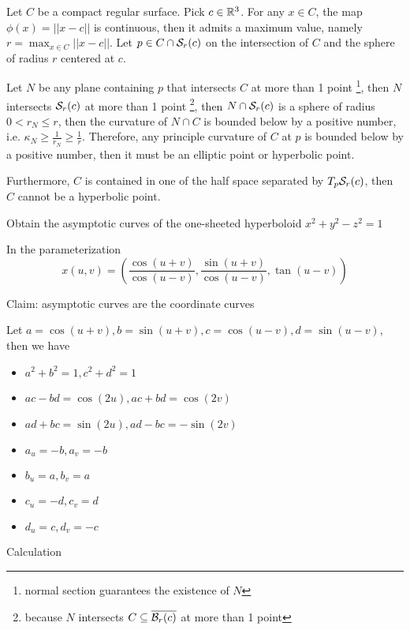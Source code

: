 \documentclass{article}
\begin{document}
Let $C$ be a compact regular surface. Pick $c \in \mathbb{R}^3$. For any $x \in C$, the map $\phi(x) = ||x - c||$ is continuous, then it admits a maximum value, namely $r = \max_{x \in C} ||x - c||$. Let $p \in C \cap \mathcal{S}_r(c)$ on the intersection of $C$ and the sphere of radius $r$ centered at $c$.

Let $N$ be any plane containing $p$ that intersects $C$ at more than 1 point \footnote{normal section guarantees the existence of $N$}, then $N$ intersects $\mathcal{S}_r(c)$ at more than 1 point \footnote{because $N$ intersects $C \subseteq \overline{\mathcal{B}_r(c)}$ at more than 1 point}, then $N \cap \mathcal{S}_r(c)$ is a sphere of radius $0 < r_N \leq r$, then the curvature of $N \cap C$ is bounded below by a positive number, i.e. $\kappa_N \geq \frac{1}{r_N} \geq \frac{1}{r}$. Therefore, any principle curvature of $C$ at $p$ is bounded below by a positive number, then it must be an elliptic point or hyperbolic point.

 Furthermore, $C$ is contained in one of the half space separated by $T_p \mathcal{S}_r(c)$, then $C$ cannot be a hyperbolic point.





\begin{problem}
    Obtain the asymptotic curves of the one-sheeted hyperboloid $x^2 + y^2 - z^2 = 1$
\end{problem}

In the parameterization
\[
    x(u, v) = \left( \frac{\cos (u+v)}{\cos (u-v)}, \frac{\sin(u+v)}{\cos(u-v)}, \tan(u-v) \right)
\]

Claim: asymptotic curves are the coordinate curves

Let $a = \cos(u+v), b = \sin(u+v), c = \cos(u-v), d = \sin(u-v)$, then we have
\begin{itemize}
    \item $a^2 + b^2 = 1, c^2 + d^2 = 1$
    \item $ac - bd = \cos (2u), ac + bd = \cos (2v)$
    \item $ad + bc = \sin (2u), ad - bc = -\sin  (2v)$
    \item $a_u = -b, a_v = -b$
    \item $b_u = a, b_v = a$
    \item $c_u = -d, c_v = d$
    \item $d_u = c, d_v = -c$
\end{itemize}

Calculation
\end{document}
